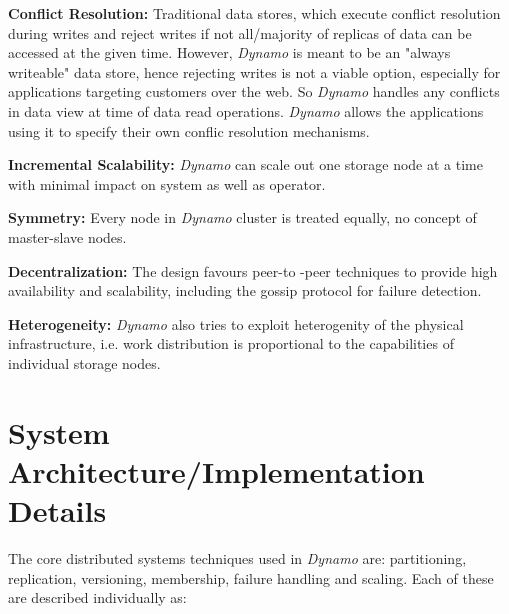 \documentclass[12pt, a4paper]{article}
\begin{document}
\textbf{Conflict Resolution:} Traditional data stores, which execute conflict resolution during writes and reject writes if not all/majority of replicas of data can be accessed at the given time. However, \textit{Dynamo}\cite{DeCandia:2007:DAH:1294261.1294281} is meant to be an "always writeable" data store, hence rejecting writes is not a viable option, especially for applications targeting customers over the web. So \textit{Dynamo}\cite{DeCandia:2007:DAH:1294261.1294281} handles any conflicts in data view at time of data read operations. \textit{Dynamo}\cite{DeCandia:2007:DAH:1294261.1294281} allows the applications using it to specify their own conflic resolution mechanisms.\par

\textbf{Incremental Scalability:} \textit{Dynamo}\cite{DeCandia:2007:DAH:1294261.1294281} can scale out one storage node at a time with minimal impact on system as well as operator.\par

\textbf{Symmetry:} Every node in \textit{Dynamo}\cite{DeCandia:2007:DAH:1294261.1294281} cluster is treated equally, no concept of master-slave nodes.\par

\textbf{Decentralization:} The design favours peer-to -peer techniques to provide high availability and scalability, including the gossip protocol for failure detection.\par

\textbf{Heterogeneity:} \textit{Dynamo}\cite{DeCandia:2007:DAH:1294261.1294281} also tries to exploit heterogenity of the physical infrastructure, i.e. work distribution is proportional to the capabilities of individual storage nodes.\par

\section*{System Architecture/Implementation Details}
The core distributed systems techniques used in \textit{Dynamo}\cite{DeCandia:2007:DAH:1294261.1294281} are: partitioning, replication, versioning, membership, failure handling and scaling. Each of these are described individually as:
\end{document}
